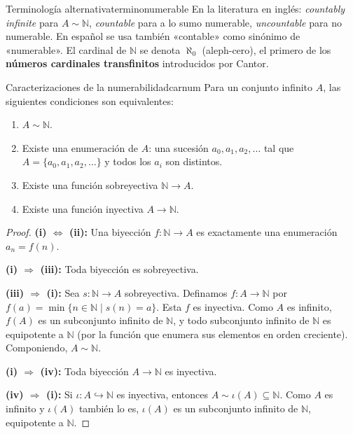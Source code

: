 \begin{observacion}{Terminología alternativa}{terminonumerable}
En la literatura en inglés: \emph{countably infinite} para $A \sim \mathbb{N}$, \emph{countable} para a lo sumo numerable, \emph{uncountable} para no numerable. En español se usa también «contable» como sinónimo de «numerable». El cardinal de $\mathbb{N}$ se denota $\aleph_0$ (aleph-cero), el primero de los \textbf{números cardinales transfinitos} introducidos por Cantor.
\end{observacion}

\begin{teorema}{Caracterizaciones de la numerabilidad}{carnum}
Para un conjunto infinito $A$, las siguientes condiciones son equivalentes:
\begin{enumerate}[leftmargin=2em, label=(\roman*)]
  \item $A \sim \mathbb{N}$.
  \item Existe una enumeración de $A$: una sucesión $a_0, a_1, a_2, \ldots$ tal que $A = \{a_0, a_1, a_2, \ldots\}$ y todos los $a_i$ son distintos.
  \item Existe una función sobreyectiva $\mathbb{N} \to A$.
  \item Existe una función inyectiva $A \to \mathbb{N}$.
\end{enumerate}
\end{teorema}

\begin{proof}
\textbf{(i) $\Leftrightarrow$ (ii):} Una biyección $f: \mathbb{N} \to A$ es exactamente una enumeración $a_n = f(n)$.

\textbf{(i) $\Rightarrow$ (iii):} Toda biyección es sobreyectiva.

\textbf{(iii) $\Rightarrow$ (i):} Sea $s: \mathbb{N} \to A$ sobreyectiva. Definamos $f: A \to \mathbb{N}$ por $f(a) = \min\{n \in \mathbb{N} \mid s(n) = a\}$. Esta $f$ es inyectiva. Como $A$ es infinito, $f(A)$ es un subconjunto infinito de $\mathbb{N}$, y todo subconjunto infinito de $\mathbb{N}$ es equipotente a $\mathbb{N}$ (por la función que enumera sus elementos en orden creciente). Componiendo, $A \sim \mathbb{N}$.

\textbf{(i) $\Rightarrow$ (iv):} Toda biyección $A \to \mathbb{N}$ es inyectiva.

\textbf{(iv) $\Rightarrow$ (i):} Si $\iota: A \hookrightarrow \mathbb{N}$ es inyectiva, entonces $A \sim \iota(A) \subseteq \mathbb{N}$. Como $A$ es infinito y $\iota(A)$ también lo es, $\iota(A)$ es un subconjunto infinito de $\mathbb{N}$, equipotente a $\mathbb{N}$.
\end{proof}

